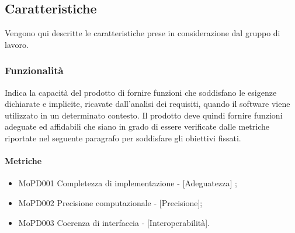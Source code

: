 \documentclass[../piano-di-qualifica.tex]{subfiles}
\begin{document}
\subsection{Caratteristiche}%
\label{sub:caratteristiche}
Vengono qui descritte le caratteristiche prese in considerazione dal gruppo di lavoro.

\subsubsection{Funzionalità}%
\label{sub:funzionalita}
Indica la capacità del prodotto di fornire funzioni che soddisfano le esigenze dichiarate e implicite, ricavate dall'analisi dei requisiti, quando il software viene utilizzato in un determinato contesto.
Il prodotto deve quindi fornire funzioni adeguate ed affidabili che siano in grado di essere verificate dalle metriche riportate nel seguente paragrafo per soddisfare gli obiettivi fissati.

\paragraph{Metriche}
\label{sub:metriche}
\begin{itemize}
    \item MoPD001 Completezza di implementazione - [Adeguatezza] ;
    \item MoPD002 Precisione computazionale - [Precisione];
    \item MoPD003 Coerenza di interfaccia - [Interoperabilità].
\end{itemize}
\end{document}

